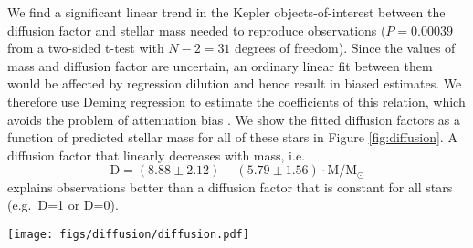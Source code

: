 \documentclass[manuscript]{aastex}
\begin{document}
We find a significant linear trend in the Kepler objects-of-interest between the diffusion factor and stellar mass needed to reproduce observations ($P = 0.00039$ from a two-sided t-test with $N-2=31$ degrees of freedom). Since the values of mass and diffusion factor are uncertain, an ordinary linear fit between them would be affected by regression dilution and hence result in biased estimates. We therefore use Deming regression to estimate the coefficients of this relation, which avoids the problem of attenuation bias \citep{deming1943statistical}. We show the fitted diffusion factors as a function of predicted stellar mass for all of these stars in Figure \ref{fig:diffusion}. A diffusion factor that linearly decreases with mass, i.e.~
\begin{equation}
    \text{D} = ( 8.88 \pm 2.12 ) - ( 5.79 \pm 1.56 ) \cdot \text{M}/\text{M}_\odot
\end{equation}
explains observations better than a diffusion factor that is constant for all stars (e.g.~D=1 or D=0). 

\begin{figure*}
    \centering
    \texttt{[image: figs/diffusion/diffusion.pdf]}
    \caption{Diffusion factor as a function of stellar mass for 33 Kepler objects-of-interest, with D being shown in log space. A significant linear trend can be seen to exist between D and M. \label{fig:diffusion} } 
\end{figure*}

\end{document}
